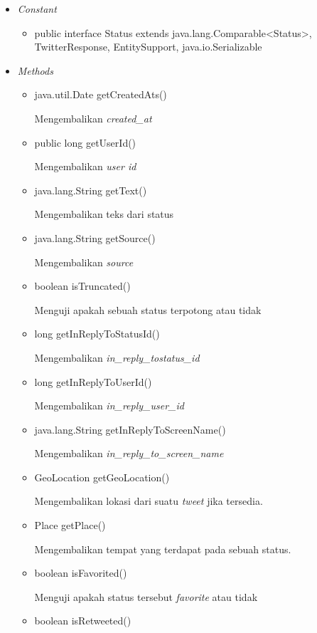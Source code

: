 	\begin{itemize}
		\item \textit{Constant}
		
		\begin{itemize}
			\item public interface Status
			extends java.lang.Comparable<Status>, TwitterResponse, EntitySupport, java.io.Serializable
						
		\end{itemize}
		\item \textit{Methods}
		
		\begin{itemize}
			\item java.util.Date getCreatedAts()
			
			Mengembalikan \textit{created\_at}
			\item public long getUserId()
			
			Mengembalikan \textit{user id}
			\item java.lang.String getText()
			
			Mengembalikan teks dari status
			\item java.lang.String getSource()
			
			Mengembalikan \textit{source}
			\item boolean isTruncated()
			
			Menguji apakah sebuah status terpotong atau tidak
			\item long getInReplyToStatusId()
			
			Mengembalikan \textit{in\_reply\_tostatus\_id}
			\item long getInReplyToUserId()
			
			Mengembalikan \textit{in\_reply\_user\_id}
			\item java.lang.String getInReplyToScreenName()
			
			Mengembalikan \textit{in\_reply\_to\_screen\_name}
			\item GeoLocation getGeoLocation()
			
			Mengembalikan lokasi dari suatu \textit{tweet} jika tersedia.
			\item Place getPlace()
			
			Mengembalikan tempat yang terdapat pada sebuah status.
			\item boolean isFavorited()
			
			Menguji apakah status tersebut \textit{favorite} atau tidak
			\item boolean isRetweeted()
			

\end{itemize}
\end{itemize}
